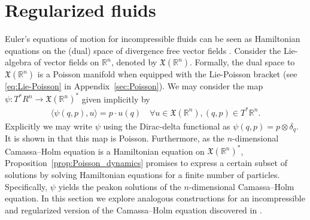 \documentclass[12pt]{amsart}
\begin{document}
\section{Regularized fluids}
\label{sec:reg_fluids}
  Euler's equations of motion for incompressible fluids can be seen as
  Hamiltonian equations on the (dual) space of divergence
  free vector fields \cite{Arnold1966}.
  Consider the Lie-algebra of vector fields on $\mathbb{R}^n$, 
  denoted by $\mathfrak{X}(\mathbb{R}^n)$.
  Formally, the dual space to $\mathfrak{X}(\mathbb{R}^n)$ is a Poisson
  manifold when equipped with the Lie-Poisson bracket
  (see \eqref{eq:Lie-Poisson} in Appendix~\ref{sec:Poisson}).
  We may consider the map
  $\psi: T^*R^n \to \mathfrak{X}(\mathbb{R}^n)^*$
  given implicitly by
  \begin{align*}
    \langle \psi(q,p) , u \rangle = p \cdot u(q) \quad
    \forall u \in \mathfrak{X}(\mathbb{R}^n), (q,p) \in T^*\mathbb{R}^n.
  \end{align*}
  Explicitly we may write $\psi$ using the Dirac-delta
  functional as $\psi(q,p) = p \otimes \delta_q$.
  It is shown in \cite{HolmMarsden2005} that this map is Poisson.
  Furthermore, as the $n$-dimensional Camassa--Holm equation \cite{CamassaHolm1993} is a
  Hamiltonian equation on $\mathfrak{X}(\mathbb{R}^n)^*$,
  Proposition~\ref{prop:Poisson_dynamics} promises to express a 
  certain subset
  of solutions by solving Hamiltonian equations for a finite number
  of particles.
  Specifically, $\psi$ yields the peakon solutions of the $n$-dimensional
  Camassa--Holm equation.
  In this section we explore analogous constructions for
  an incompressible and regularized version of the
  Camassa--Holm equation discovered in \cite{MumfordMichor2013}.
\end{document}
